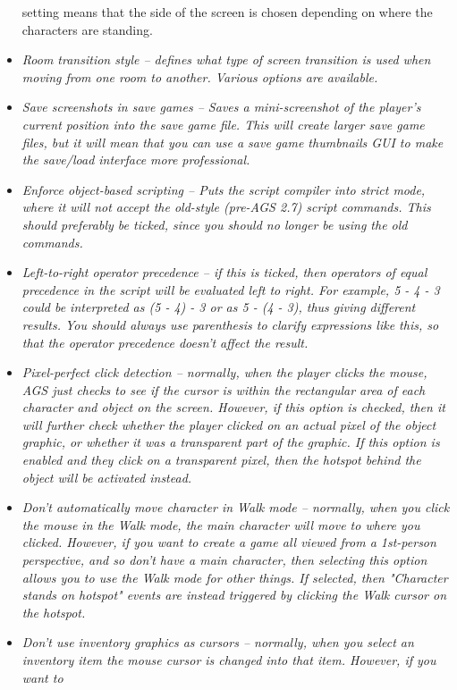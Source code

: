 \begin{itemize}
setting means that the side of the screen is chosen depending on where the characters are
standing.
\item \it{Room transition style} -- defines what type of screen transition is used when
moving from one room to another. Various options are available.
\item \it{Save screenshots in save games} -- Saves a mini-screenshot of the player's current
position into the save game file. This will create larger save game files, but it will
mean that you can use a save game thumbnails GUI to make the save/load interface
more professional.
\item \it{Enforce object-based scripting} -- Puts the script compiler into strict mode,
where it will not accept the old-style (pre-AGS 2.7) script commands. This should
preferably be ticked, since you should no longer be using the old commands.
\item \it{Left-to-right operator precedence} -- if this is ticked, then operators of
equal precedence in the script will be evaluated left to right. For example,
5 - 4 - 3 could be interpreted as  (5 - 4) - 3  or as  5 - (4 - 3), thus giving
different results. You should always use parenthesis to clarify expressions like this,
so that the operator precedence doesn't affect the result.
\item \it{Pixel-perfect click detection} -- normally, when the player clicks the
mouse, AGS just checks to see if the cursor is within the rectangular area
of each character and object on the screen. However, if this option is
checked, then it will further check whether the player clicked on an actual
pixel of the object graphic, or whether it was a transparent part of the
graphic. If this option is enabled and they click on a transparent pixel,
then the hotspot behind the object will be activated instead.
\item \it{Don't automatically move character in Walk mode} -- normally, when you click the mouse in
the Walk mode, the main character will move to where you clicked. However,
if you want to create a game all viewed from a 1st-person perspective, and
so don't have a main character, then selecting this option allows you to
use the Walk mode for other things. If selected, then "Character stands on
hotspot" events are instead triggered by clicking the Walk cursor on the
hotspot.
\item \it{Don't use inventory graphics as cursors} -- normally, when you select an inventory
item the mouse cursor is changed into that item. However, if you want to

\end{itemize}
